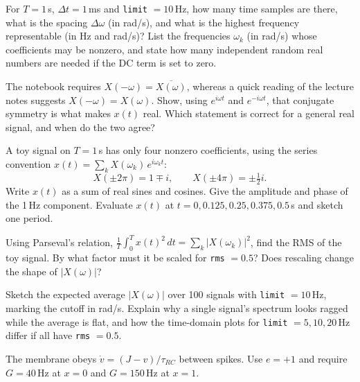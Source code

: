 \documentclass[10pt,letterpaper]{article}
\newcommand{\trc}{\tau_{RC}}
\newcommand{\qsec}[1]{\vspace{8pt}{\large\bfseries #1}\par\vspace{2pt}}
\begin{document}
\begin{parts}
\item[1a.] For $T = 1$\,s, $\Delta t = 1$\,ms and \texttt{limit} $= 10$\,Hz, how many time samples are there, what is the spacing $\Delta\omega$ (in rad/s), and what is the highest frequency representable (in Hz and rad/s)? List the frequencies $\omega_k$ (in rad/s) whose coefficients may be nonzero, and state how many independent random real numbers are needed if the DC term is set to zero.

\item[1b.] The notebook requires $X(-\omega) = \overline{X(\omega)}$, whereas a quick reading of the lecture notes suggests $X(-\omega) = X(\omega)$. Show, using $e^{i\omega t}$ and $e^{-i\omega t}$, that conjugate symmetry is what makes $x(t)$ real. Which statement is correct for a general real signal, and when do the two agree?

\item[1c.] A toy signal on $T = 1$\,s has only four nonzero coefficients, using the series convention $x(t) = \sum_k X(\omega_k)\, e^{i\omega_k t}$:
\[
X(\pm 2\pi) = 1 \mp i, \qquad X(\pm 4\pi) = \pm\tfrac{1}{2} i .
\]
Write $x(t)$ as a sum of real sines and cosines. Give the amplitude and phase of the 1\,Hz component. Evaluate $x(t)$ at $t = 0, 0.125, 0.25, 0.375, 0.5$\,s and sketch one period.

\item[1d.] Using Parseval's relation, $\frac{1}{T}\int_0^T x(t)^2\,dt = \sum_k |X(\omega_k)|^2$, find the RMS of the toy signal. By what factor must it be scaled for \texttt{rms} $= 0.5$? Does rescaling change the shape of $|X(\omega)|$?

\item[1e.] Sketch the expected average $|X(\omega)|$ over 100 signals with \texttt{limit} $= 10$\,Hz, marking the cutoff in rad/s. Explain why a single signal's spectrum looks ragged while the average is flat, and how the time-domain plots for \texttt{limit} $= 5, 10, 20$\,Hz differ if all have \texttt{rms} $= 0.5$.
\end{parts}

\qsec{2. A single spiking LIF neuron}
The membrane obeys $\dot v = (J - v)/\trc$ between spikes. Use $e = +1$ and require $G = 40$\,Hz at $x = 0$ and $G = 150$\,Hz at $x = 1$.
\end{document}
